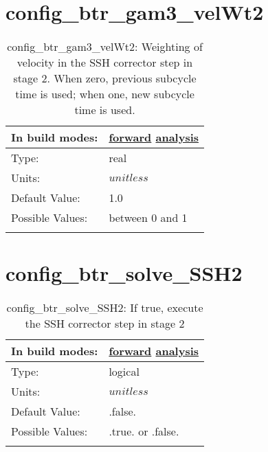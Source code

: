 \section[config\_btr\_gam3\_velWt2]{config\_btr\_gam3\_velWt2}
\label{sec:nm_sec_config_btr_gam3_velWt2}
\begin{center}
\begin{longtable}{| p{2.0in} || p{4.0in} |}
    \hline
    In build modes: & \hyperref[subsec:forward_nm_tab_split_explicit_ts]{forward} \hyperref[subsec:analysis_nm_tab_split_explicit_ts]{analysis} \\
    \hline
    Type: & real \\
    \hline
    Units: & $unitless$ \\
    \hline
    Default Value: & 1.0 \\
    \hline
    Possible Values: & between 0 and 1 \\
    \hline
    \caption{config\_btr\_gam3\_velWt2: Weighting of velocity in the SSH corrector step in stage 2. When zero, previous subcycle time is used; when one, new subcycle time is used.}
\end{longtable}
\end{center}
\section[config\_btr\_solve\_SSH2]{config\_btr\_solve\_SSH2}
\label{sec:nm_sec_config_btr_solve_SSH2}
\begin{center}
\begin{longtable}{| p{2.0in} || p{4.0in} |}
    \hline
    In build modes: & \hyperref[subsec:forward_nm_tab_split_explicit_ts]{forward} \hyperref[subsec:analysis_nm_tab_split_explicit_ts]{analysis} \\
    \hline
    Type: & logical \\
    \hline
    Units: & $unitless$ \\
    \hline
    Default Value: & .false. \\
    \hline
    Possible Values: & .true. or .false. \\
    \hline
    \caption{config\_btr\_solve\_SSH2: If true, execute the SSH corrector step in stage 2}
\end{longtable}
\end{center}
